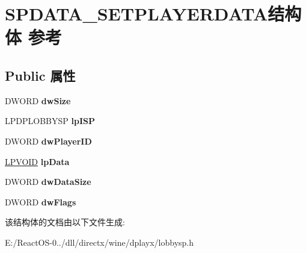 \hypertarget{struct_s_p_d_a_t_a___s_e_t_p_l_a_y_e_r_d_a_t_a}{}\section{S\+P\+D\+A\+T\+A\+\_\+\+S\+E\+T\+P\+L\+A\+Y\+E\+R\+D\+A\+T\+A结构体 参考}
\label{struct_s_p_d_a_t_a___s_e_t_p_l_a_y_e_r_d_a_t_a}
\subsection*{Public 属性}
\begin{DoxyCompactItemize}
\item 
\mbox{\label{struct_s_p_d_a_t_a___s_e_t_p_l_a_y_e_r_d_a_t_a_a77f6c5d759d225356395b48fd9343bfb}} 
D\+W\+O\+RD {\bfseries dw\+Size}
\item 
\mbox{\label{struct_s_p_d_a_t_a___s_e_t_p_l_a_y_e_r_d_a_t_a_a2189d2dde1ba9d082ee445139a8933ab}} 
L\+P\+D\+P\+L\+O\+B\+B\+Y\+SP {\bfseries lp\+I\+SP}
\item 
\mbox{\label{struct_s_p_d_a_t_a___s_e_t_p_l_a_y_e_r_d_a_t_a_aa0ee73d89050a1a78157ab599d8409fb}} 
D\+W\+O\+RD {\bfseries dw\+Player\+ID}
\item 
\mbox{\label{struct_s_p_d_a_t_a___s_e_t_p_l_a_y_e_r_d_a_t_a_a1af2d6ce841ffe8e2cfd4e0f8900defa}} 
\hyperlink{interfacevoid}{L\+P\+V\+O\+ID} {\bfseries lp\+Data}
\item 
\mbox{\label{struct_s_p_d_a_t_a___s_e_t_p_l_a_y_e_r_d_a_t_a_a73b37165252c2e81cb460abb5e7767f2}} 
D\+W\+O\+RD {\bfseries dw\+Data\+Size}
\item 
\mbox{\label{struct_s_p_d_a_t_a___s_e_t_p_l_a_y_e_r_d_a_t_a_a2748c174165660bddbf21d1a401d148f}} 
D\+W\+O\+RD {\bfseries dw\+Flags}
\end{DoxyCompactItemize}


该结构体的文档由以下文件生成\+:\begin{DoxyCompactItemize}
\item 
E\+:/\+React\+O\+S-\/0../dll/directx/wine/dplayx/lobbysp.\+h\end{DoxyCompactItemize}
